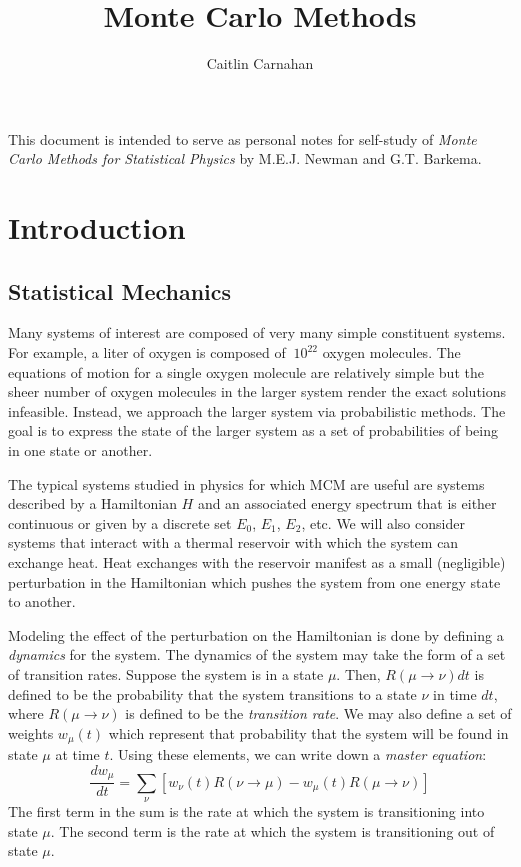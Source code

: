 \documentclass{article}
\title{Monte Carlo Methods}
\author{Caitlin Carnahan}
\begin{document}
This document is intended to serve as personal notes
for self-study of \emph{Monte Carlo Methods for Statistical Physics}
by M.E.J. Newman and G.T. Barkema.

\section{Introduction}
\subsection{Statistical Mechanics}
Many systems of interest are composed of very many simple
constituent systems. For example, a liter of oxygen
is composed of $~10^{22}$ oxygen molecules. The equations
of motion for a single oxygen molecule are relatively simple
but the sheer number of oxygen molecules in the larger system
render the exact solutions infeasible. Instead, we approach
the larger system via probabilistic methods. The goal is to
express the state of the larger system as a set of probabilities
of being in one state or another.

The typical systems studied in physics for which MCM are useful
are systems described by a Hamiltonian $H$ and an
associated energy spectrum that is either continuous or given
by a discrete set $E_{0}$, $E_{1}$, $E_{2}$, etc. We will also
consider systems that interact with a thermal reservoir with
which the system can exchange heat. Heat exchanges with the
reservoir manifest as a small (negligible) perturbation
in the Hamiltonian which pushes the system from one energy
state to another.

Modeling the effect of the perturbation on the Hamiltonian is
done by defining a \emph{dynamics} for the system. The dynamics
of the system may take the form of a set of transition rates.
Suppose the system is in a state $\mu$. Then, $R(\mu \rightarrow \nu)dt$ is
defined to be the probability that the system transitions to a state
$\nu$ in time $dt$, where $R(\mu \rightarrow \nu)$ is defined to be the
\emph{transition rate}. We may also define a set of weights $w_{\mu}(t)$
which represent that probability that the system will be found in state
$\mu$ at time $t$. Using these elements, we can write down a \emph{master
equation}:
\begin{equation}
\frac{dw_{\mu}}{dt} = \sum_{\nu}[w_{\nu}(t)R(\nu \rightarrow \mu)
                              - w_{\mu}(t)R(\mu \rightarrow \nu)]
\end{equation}
The first term in the sum is the rate at which the system is
transitioning into state $\mu$. The second term is the rate at which
the system is transitioning out of state $\mu$.
\end{document}

